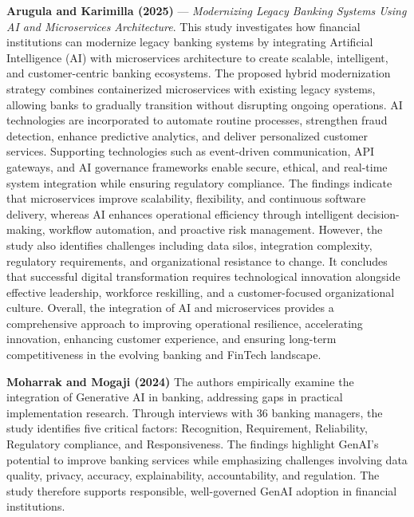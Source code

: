 \documentclass[conference]{IEEEtran}
\begin{document}
\par\medskip

\noindent\textbf{Arugula and Karimilla (2025)}\nocite{AMLAS2025} --- \emph{Modernizing Legacy Banking Systems Using AI and Microservices Architecture}. This study investigates how financial institutions can modernize legacy banking systems by integrating Artificial Intelligence (AI) with microservices architecture to create scalable, intelligent, and customer-centric banking ecosystems. The proposed hybrid modernization strategy combines containerized microservices with existing legacy systems, allowing banks to gradually transition without disrupting ongoing operations. AI technologies are incorporated to automate routine processes, strengthen fraud detection, enhance predictive analytics, and deliver personalized customer services. Supporting technologies such as event-driven communication, API gateways, and AI governance frameworks enable secure, ethical, and real-time system integration while ensuring regulatory compliance. The findings indicate that microservices improve scalability, flexibility, and continuous software delivery, whereas AI enhances operational efficiency through intelligent decision-making, workflow automation, and proactive risk management. However, the study also identifies challenges including data silos, integration complexity, regulatory requirements, and organizational resistance to change. It concludes that successful digital transformation requires technological innovation alongside effective leadership, workforce reskilling, and a customer-focused organizational culture. Overall, the integration of AI and microservices provides a comprehensive approach to improving operational resilience, accelerating innovation, enhancing customer experience, and ensuring long-term competitiveness in the evolving banking and FinTech landscape.

\par\medskip

\noindent\textbf{Moharrak and Mogaji (2024)}\nocite{Moharrak2024GenerativeAI} The authors empirically examine the integration of Generative AI in banking, addressing gaps in practical implementation research. Through interviews with 36 banking managers, the study identifies five critical factors: Recognition, Requirement, Reliability, Regulatory compliance, and Responsiveness. The findings highlight GenAI’s potential to improve banking services while emphasizing challenges involving data quality, privacy, accuracy, explainability, accountability, and regulation. The study therefore supports responsible, well-governed GenAI adoption in financial institutions.
\end{document}
